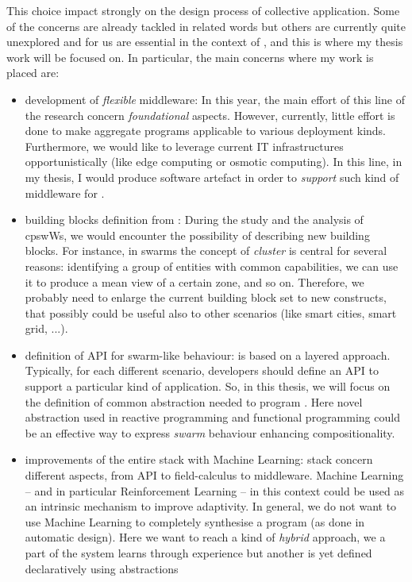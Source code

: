 \documentclass[11pt]{article}
\begin{document}
This choice impact strongly on the design process of collective application. Some of the concerns are already tackled in related words but others are currently quite unexplored and for us are essential in the context of \cpsw{}, and this is where my thesis work will be focused on.
In particular, the main concerns where my work is placed are:
\begin{itemize}
	\item development of \textit{flexible} middleware: In this year, the main effort of this line of the research concern \textit{foundational} aspects. However, currently, little effort is done to make aggregate programs applicable to various deployment kinds. Furthermore, we would like to leverage current IT infrastructures opportunistically (like edge computing or osmotic computing). In this line, in my thesis, I would produce software artefact in order to \textit{support} such kind of middleware for \cpsw{}.
	\item building blocks definition from \cpsw{}: During the study and the analysis of cpswWs, we would encounter the possibility of describing new building blocks. For instance, in swarms the concept of \emph{cluster} is central for several reasons: identifying a group of entities with common capabilities, we can use it to produce a mean view of a certain zone, and so on. Therefore, we probably need to enlarge the current building block set to new constructs, that possibly could be useful also to other scenarios (like smart cities, smart grid, ...).
	\item definition of API for swarm-like behaviour: \ac{} is based on a layered approach. Typically, for each different scenario, developers should define an API to support a particular kind of application. So, in this thesis, we will focus on the definition of common abstraction needed to program \cpsw{}. Here novel abstraction used in reactive programming and functional programming could be an effective way to express \textit{swarm} behaviour enhancing compositionality.
	\item improvements of the entire \ac{} stack with Machine Learning: \ac{} stack concern different aspects, from API to field-calculus to middleware. Machine Learning -- and in particular Reinforcement Learning -- in this context could be used as an intrinsic mechanism to improve adaptivity. In general, we do not want to use Machine Learning to completely synthesise a program (as done in automatic design). Here we want to reach a kind of \textit{hybrid} approach, we a part of the system learns through experience but another is yet defined declaratively using \ac{} abstractions
\end{itemize}
\end{document}

